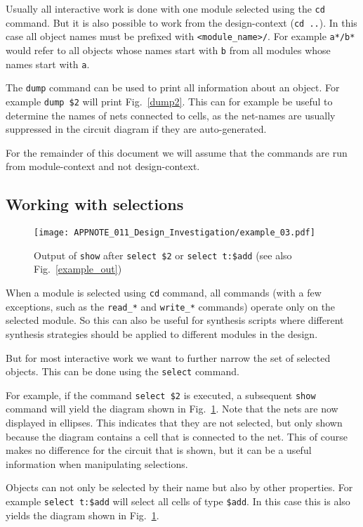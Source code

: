 \documentclass[9pt,technote,a4paper]{IEEEtran}
\begin{document}
Usually all interactive work is done with one module selected using the {\tt cd}
command. But it is also possible to work from the design-context ({\tt cd ..}). In
this case all object names must be prefixed with {\tt <module\_name>/}. For
example {\tt a*/b*} would refer to all objects whose names start with {\tt b} from
all modules whose names start with {\tt a}.

The {\tt dump} command can be used to print all information about an object.
For example {\tt dump \$2} will print Fig.~\ref{dump2}. This can for example
be useful to determine the names of nets connected to cells, as the net-names
are usually suppressed in the circuit diagram if they are auto-generated.

For the remainder of this document we will assume that the commands are run from
module-context and not design-context.

\subsection{Working with selections}

\begin{figure}[t]
\texttt{[image: APPNOTE\_011\_Design\_Investigation/example\_03.pdf]}
\caption{Output of {\tt show} after {\tt select \$2} or {\tt select t:\$add}
(see also Fig.~\ref{example_out})}
\label{seladd}
\end{figure}

When a module is selected using {\tt cd} command, all commands (with a few
exceptions, such as the {\tt read\_*} and {\tt write\_*} commands) operate
only on the selected module. So this can also be useful for synthesis scripts
where different synthesis strategies should be applied to different modules
in the design.

But for most interactive work we want to further narrow the set of selected
objects. This can be done using the {\tt select} command.

For example, if the command {\tt select \$2} is executed, a subsequent {\tt show}
command will yield the diagram shown in Fig.~\ref{seladd}. Note that the nets are
now displayed in ellipses. This indicates that they are not selected, but only
shown because the diagram contains a cell that is connected to the net. This
of course makes no difference for the circuit that is shown, but it can be a useful
information when manipulating selections.

Objects can not only be selected by their name but also by other properties.
For example {\tt select t:\$add} will select all cells of type {\tt \$add}. In
this case this is also yields the diagram shown in Fig.~\ref{seladd}.
\end{document}
